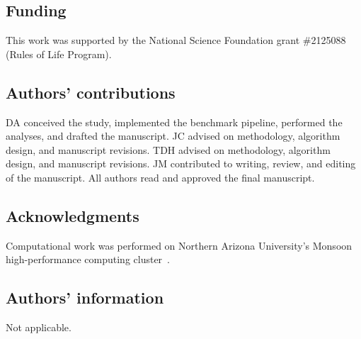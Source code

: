 \documentclass[a4paper,fleqn,longmktitle]{cas-sc}
\begin{document}
\subsection*{Funding}
This work was supported by the National Science Foundation grant \#2125088 (Rules of Life Program).

\subsection*{Authors' contributions}
DA conceived the study, implemented the benchmark pipeline, performed the analyses, and drafted the manuscript.
JC advised on methodology, algorithm design, and manuscript revisions.
TDH advised on methodology, algorithm design, and manuscript revisions.
JM contributed to writing, review, and editing of the manuscript.
All authors read and approved the final manuscript.

\subsection*{Acknowledgments}
Computational work was performed on Northern Arizona University's Monsoon high-performance computing cluster~\citep{Buechler2025MonsoonIntro}.

\subsection*{Authors' information}
Not applicable.




\clearpage
\appendix

\end{document}
